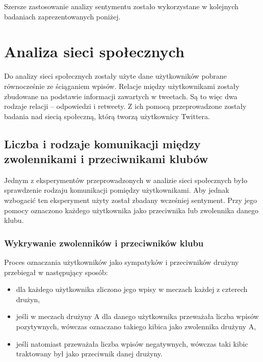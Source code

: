 \bigskip
Szersze zastosowanie analizy sentymentu zostało wykorzystane w kolejnych
badaniach zaprezentowanych poniżej.






















\clearpage
\section{Analiza sieci społecznych}
\label{section:analizaspoleczna}
Do analizy sieci społecznych zostały użyte dane użytkowników pobrane 
równocześnie ze ściąganiem wpisów. Relacje między użytkownikami zostały
zbudowane na podstawie informacji zawartych w tweetach. Są to więc
dwa rodzaje relacji -- odpowiedzi i retweety. Z ich pomocą przeprowadzone
zostały badania nad siecią społeczną, którą tworzą użytkownicy Twittera. 






\subsection{Liczba i rodzaje komunikacji między zwolennikami i przeciwnikami klubów}

Jednym z eksperymentów przeprowadzonych w analizie sieci społecznych było
sprawdzenie rodzaju komunikacji pomiędzy użytkownikami. Aby jednak wzbogacić
ten eksperyment użyty został zbadany wcześniej sentyment. Przy jego pomocy
oznaczono każdego użytkownika jako przeciwnika lub zwolennika danego klubu.

\subsubsection{Wykrywanie zwolenników i przeciwników klubu}
Proces oznaczania użytkowników jako sympatyków i przeciwników drużyny przebiegał
w następujący sposób:
\begin{itemize}
  \item dla każdego użytkownika zliczono jego wpisy w meczach każdej z czterech 
  drużyn,
  \item jeśli w meczach drużyny A dla danego użytkownika przeważała liczba 
  wpisów pozytywnych, wówczas oznaczano takiego kibica jako zwolennika drużyny A,
  \item jeśli natomiast przeważała liczba wpisów negatywnych, wówczas taki kibic
  traktowany był jako przeciwnik danej drużyny.  
\end{itemize} 


